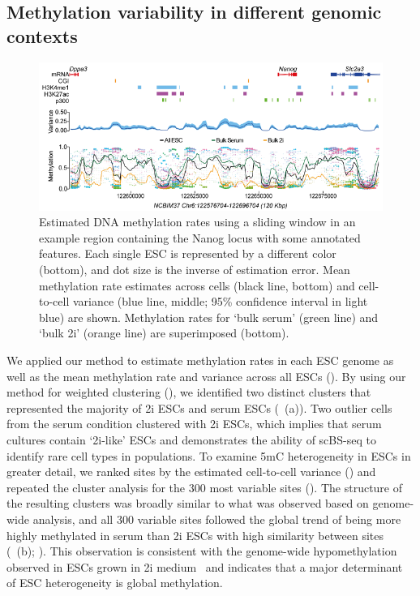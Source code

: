 \subsection{Methylation variability in different genomic contexts} \label{sec:bs_results}

\begin{figure}[htbp!]
\centering
\includegraphics[width=1.0\textwidth]{zoom}
\caption[Estimated methylation rates for Nanog locus.]{Estimated DNA methylation rates using a sliding window in an example region containing the Nanog locus with some annotated features. Each single ESC is represented by a different color (bottom), and dot size is the inverse of estimation error. Mean methylation rate estimates across cells (black line, bottom) and cell-to-cell variance (blue line, middle; 95\% confidence interval in light blue) are shown. Methylation rates for `bulk serum' (green line) and `bulk 2i' (orange line) are superimposed (bottom).}
\label{fig:bs_zoom}
\end{figure}

We applied our method to estimate methylation rates in each ESC genome as well as the mean methylation rate and variance across all ESCs (). By using our method for weighted clustering (), we identified two distinct clusters that represented the majority of 2i ESCs and serum ESCs (~(a)). Two outlier cells from the serum condition clustered with 2i ESCs, which implies that serum cultures contain `2i-like' ESCs and demonstrates the ability of scBS-seq to identify rare cell types in populations. To examine 5mC heterogeneity in ESCs in greater detail, we ranked sites by the estimated cell-to-cell variance () and repeated the cluster analysis for the 300 most variable sites (). The structure of the resulting clusters was broadly similar to what was observed based on genome-wide analysis, and all 300 variable sites followed the global trend of being more highly methylated in serum than 2i ESCs with high similarity between sites (~(b); ). This observation is consistent with the genome-wide hypomethylation observed in ESCs grown in 2i medium~\citep{ficz_fgf_2013} and indicates that a major determinant of ESC heterogeneity is global methylation.

